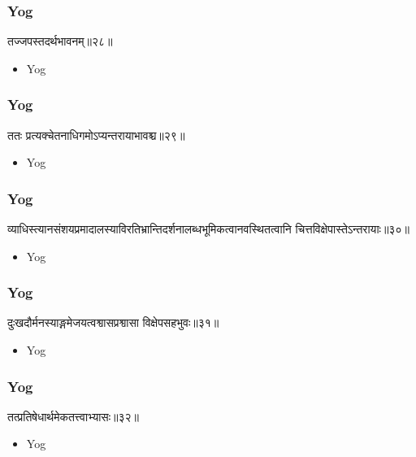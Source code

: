 \begin{frame}[fragile]\frametitle{Yog}
\begin{sanskrit}
तज्जपस्तदर्थभावनम्॥२८॥
\end{sanskrit}
	\begin{itemize}
	\item Yog 
	\end{itemize}
\end{frame}


\begin{frame}[fragile]\frametitle{Yog}
\begin{sanskrit}
ततः प्रत्यक्चेतनाधिगमोऽप्यन्तरायाभावश्च॥२९॥
\end{sanskrit}
	\begin{itemize}
	\item Yog 
	\end{itemize}
\end{frame}




\begin{frame}[fragile]\frametitle{Yog}
\begin{sanskrit}
व्याधिस्त्यानसंशयप्रमादालस्याविरतिभ्रान्तिदर्शनालब्धभूमिकत्वानवस्थितत्वानि चित्तविक्षेपास्तेऽन्तरायाः॥३०॥
\end{sanskrit}
	\begin{itemize}
	\item Yog 
	\end{itemize}
\end{frame}




\begin{frame}[fragile]\frametitle{Yog}
\begin{sanskrit}
दुःखदौर्मनस्याङ्गमेजयत्वश्वासप्रश्वासा विक्षेपसहभुवः॥३१॥
\end{sanskrit}
	\begin{itemize}
	\item Yog 
	\end{itemize}
\end{frame}



\begin{frame}[fragile]\frametitle{Yog}
\begin{sanskrit}
तत्प्रतिषेधार्थमेकतत्त्वाभ्यासः॥३२॥
\end{sanskrit}
	\begin{itemize}
	\item Yog 
	\end{itemize}
\end{frame}




